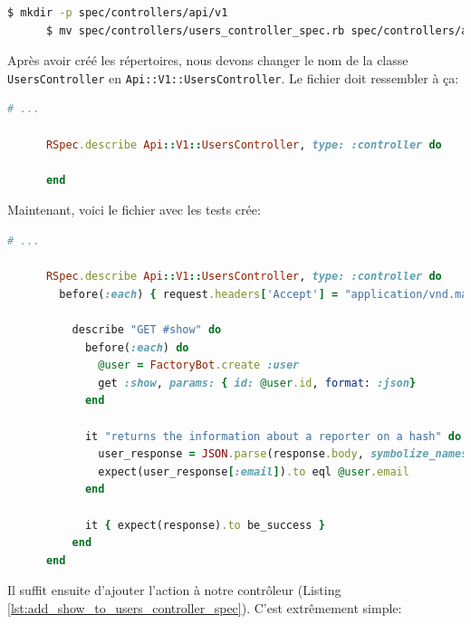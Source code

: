 \documentclass[]{report}
\begin{document}
    \begin{scriptsize}
      \begin{lstlisting}[language=bash]
      $ mkdir -p spec/controllers/api/v1
      $ mv spec/controllers/users_controller_spec.rb spec/controllers/api/v1
      \end{lstlisting}
    \end{scriptsize}

    Après avoir créé les répertoires, nous devons changer le nom de la classe \verb|UsersController| en \verb|Api::V1::UsersController|. Le fichier doit ressembler à ça:

    \begin{scriptsize}
      \begin{lstlisting}[language=ruby]
      # ...

      RSpec.describe Api::V1::UsersController, type: :controller do

      end
      \end{lstlisting}
    \end{scriptsize}

    Maintenant, voici le fichier avec les tests crée:

    \begin{scriptsize}
      \begin{lstlisting}[language=ruby, caption={Le test du contrôlleur des utilisateur  (spec/controllers/api/v1/users\_controller\_spec.rb)}, label={lst:add_show_test_to_users_controller_spec}]
      # ...

      RSpec.describe Api::V1::UsersController, type: :controller do
        before(:each) { request.headers['Accept'] = "application/vnd.marketplace.v1" }

          describe "GET #show" do
            before(:each) do
              @user = FactoryBot.create :user
              get :show, params: { id: @user.id, format: :json}
            end

            it "returns the information about a reporter on a hash" do
              user_response = JSON.parse(response.body, symbolize_names: true)
              expect(user_response[:email]).to eql @user.email
            end

            it { expect(response).to be_success }
          end
      end
      \end{lstlisting}
    \end{scriptsize}

    Il suffit ensuite d'ajouter l'action à notre contrôleur (Listing \ref{lst:add_show_to_users_controller_spec}). C'est extrêmement simple:
\end{document}
